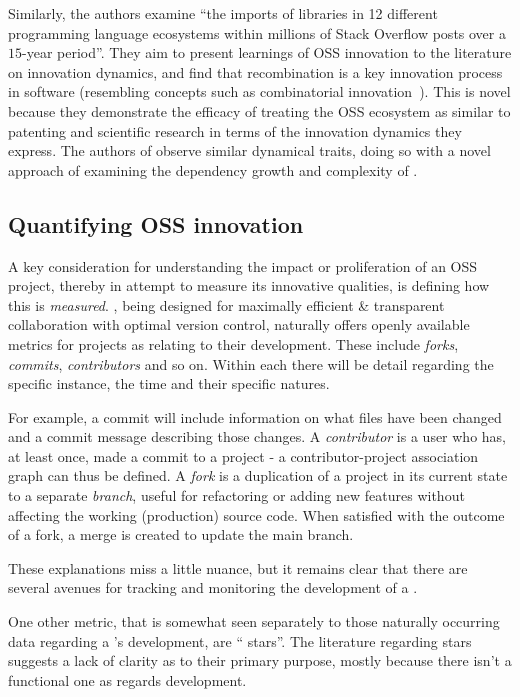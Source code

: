 Similarly, the authors \cite{meszaros_2024_DynamicsInnovation} examine ``the imports of libraries in 12 different programming language ecosystems within millions of Stack Overflow posts over a $15$-year period''.
They aim to present learnings of OSS innovation to the literature on innovation dynamics, and find that recombination is a key innovation process in software (resembling concepts such as combinatorial innovation~\cite{croitoru_2017_SchumpeterJoseph}).
This is novel because they demonstrate the efficacy of treating the OSS ecosystem as similar to patenting and scientific research in terms of the innovation dynamics they express.
The authors of \cite{brown_2025_MeasuringSoftware} observe similar dynamical traits, doing so with a novel approach of examining the dependency growth and complexity of \ghrepo{}.

\subsection{Quantifying OSS innovation}

A key consideration for understanding the impact or proliferation of an OSS project, thereby in attempt to measure its innovative qualities, is defining how this is \emph{measured}.
\gh{}, being designed for maximally efficient \& transparent collaboration with optimal version control, naturally offers openly available metrics for projects as relating to their development.
These include \emph{forks}, \emph{commits}, \emph{contributors} and so on. Within each there will be detail regarding the specific instance, the time and their specific natures.

For example, a commit will include information on what files have been changed and a commit message describing those changes.
A \emph{contributor} is a user who has, at least once, made a commit to a project - a contributor-project association graph can thus be defined.
A \emph{fork} is a duplication of a project in its current state to a separate \emph{branch}, useful for refactoring or adding new features without affecting the working (production) source code.
When satisfied with the outcome of a fork, a merge is created to update the main branch.

These explanations miss a little nuance, but it remains clear that there are several avenues for tracking and monitoring the development of a \ghrepo{}.

One other metric, that is somewhat seen separately to those naturally occurring data regarding a \repo{}'s development, are ``\gh{} stars''.
The literature regarding stars suggests a lack of clarity as to their primary purpose, mostly because there isn't a functional one as regards development.

